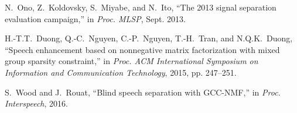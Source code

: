 \documentclass{article}
\begin{document}
\begin{thebibliography}{9}


N.~Ono, Z.~Koldovsky, S.~Miyabe, and N.~Ito, 
\newblock ``The 2013 signal separation evaluation campaign,'' 
\newblock in {\em Proc. MLSP}, Sept. 2013.

H.-T.T.~Duong, Q.-C.~Nguyen, C.-P.~Nguyen, T.-H.~Tran, and N.Q.K.~Duong,
\newblock ``Speech enhancement based on nonnegative matrix factorization with mixed group sparsity constraint,''
\newblock in {\em Proc. ACM  International Symposium on Information and Communication Technology}, 2015, pp. 247--251.


S.~Wood and J.~Rouat, 
\newblock ``Blind speech separation with GCC-NMF,'' 
\newblock in {\em Proc. Interspeech}, 2016.
\end{thebibliography}
\end{document}
